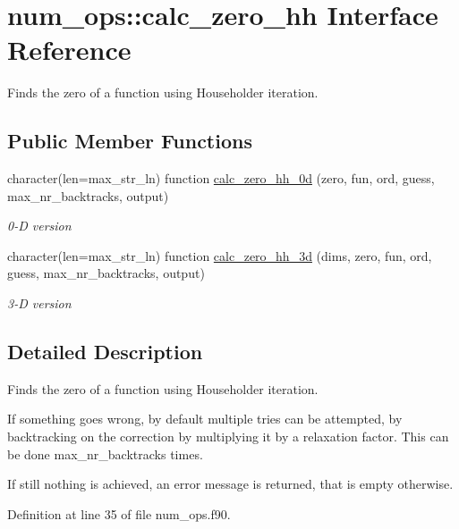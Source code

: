 \hypertarget{interfacenum__ops_1_1calc__zero__hh}{}\section{num\+\_\+ops\+:\+:calc\+\_\+zero\+\_\+hh Interface Reference}
\label{interfacenum__ops_1_1calc__zero__hh}


Finds the zero of a function using Householder iteration.  


\subsection*{Public Member Functions}
\begin{DoxyCompactItemize}
\item 
character(len=max\+\_\+str\+\_\+ln) function \hyperlink{interfacenum__ops_1_1calc__zero__hh_a6330f69d337ac43c8a529448f0f7048c}{calc\+\_\+zero\+\_\+hh\+\_\+0d} (zero, fun, ord, guess, max\+\_\+nr\+\_\+backtracks, output)
\begin{DoxyCompactList}\small\item\em 0-\/D version \end{DoxyCompactList}\item 
character(len=max\+\_\+str\+\_\+ln) function \hyperlink{interfacenum__ops_1_1calc__zero__hh_aa02df32d89ed7f87f0876756e9f3c7df}{calc\+\_\+zero\+\_\+hh\+\_\+3d} (dims, zero, fun, ord, guess, max\+\_\+nr\+\_\+backtracks, output)
\begin{DoxyCompactList}\small\item\em 3-\/D version \end{DoxyCompactList}\end{DoxyCompactItemize}


\subsection{Detailed Description}
Finds the zero of a function using Householder iteration. 

If something goes wrong, by default multiple tries can be attempted, by backtracking on the correction by multiplying it by a relaxation factor. This can be done {\ttfamily max\+\_\+nr\+\_\+backtracks} times.

If still nothing is achieved, an error message is returned, that is empty otherwise. 

Definition at line 35 of file num\+\_\+ops.\+f90.



